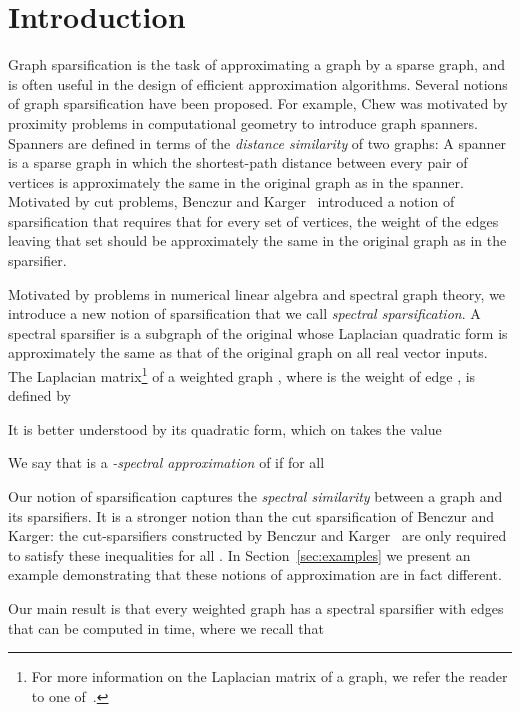 \documentclass[11pt]{article}
\begin{document}
\newpage


\section{Introduction}
Graph sparsification is the task of approximating a graph by a sparse graph,
  and is often useful in the design of efficient approximation algorithms.
Several notions of graph sparsification have been proposed.
For example, Chew \cite{PaulChew}
  was motivated by  proximity problems in computational geometry
  to introduce graph spanners.
Spanners are defined in terms of the {\em distance similarity}
  of two graphs:
A spanner is a sparse graph in which the shortest-path distance 
  between every pair of vertices is approximately the same in the original graph
  as in the spanner.
Motivated by cut problems, Benczur and Karger~\cite{BenczurKarger} introduced
  a notion of sparsification that requires that for every set of vertices,
  the weight of the edges
  leaving that set should be approximately the same 
  in the original graph as in the sparsifier.

Motivated by problems in numerical linear algebra and spectral graph theory,
  we introduce a new notion of sparsification 
  that we call \textit{spectral sparsification}.
A spectral sparsifier is a subgraph of the original whose Laplacian
  quadratic form is approximately the same as that of the original graph
  on all real vector inputs.
The Laplacian matrix\footnote{For more information on the Laplacian matrix of a graph, we refer the
  reader to one of~\cite{BollobasMGT,Mohar91Laplacian,GodsilRoyle,Chung}.} of a weighted graph , where  is the weight of edge , is defined by

It is better understood by its quadratic form, which on 
  takes the value


We say that  is a { \em -spectral approximation}
   of  if for all 



Our notion of sparsification captures the {\em spectral similarity}
  between a graph and its sparsifiers.
It is  a stronger notion than the
  cut sparsification of Benczur and Karger:
 the cut-sparsifiers constructed by Benczur and Karger~\cite{BenczurKarger}
  are only required to satisfy these inequalities for all .
In Section~\ref{sec:examples} we present an example demonstrating that these notions
  of approximation are in fact different.


Our main result is
  that every weighted graph has a spectral sparsifier with
   edges that can be computed in
   time,
 where we recall that
  
\end{document}
